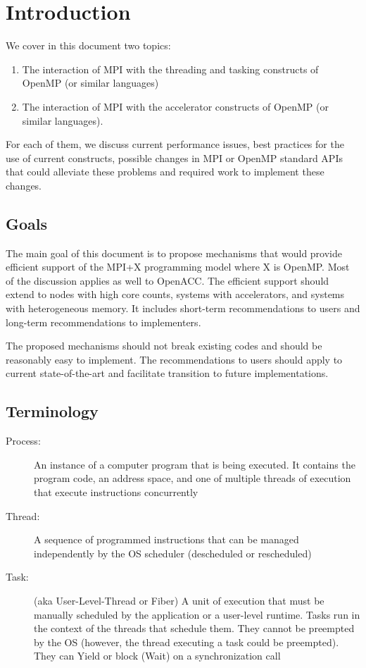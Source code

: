 \section{Introduction}
We cover in this document two topics:
\begin{enumerate}
	\item The interaction of MPI with the threading and tasking constructs of 
	OpenMP (or similar languages)
	\item The interaction of MPI with the accelerator constructs of OpenMP (or 
	similar languages).
\end{enumerate}

For each of them, we discuss current performance issues, best practices for the 
use of current constructs, possible changes in MPI or OpenMP standard APIs that 
could alleviate these problems and  required work to implement these changes.

\subsection{Goals}
The main goal of this document is to propose mechanisms that would provide 
efficient support of the MPI+X programming 
model where X is OpenMP. Most of the discussion applies as well to OpenACC. The 
efficient support should extend to nodes with high core counts, systems with 
accelerators, and systems with heterogeneous memory. It includes short-term 
recommendations to users and long-term recommendations to implementers.

The proposed mechanisms should not break existing codes and should be 
reasonably easy to implement. The recommendations to users should apply to 
current state-of-the-art and facilitate transition to future implementations.

\subsection{Terminology}
\begin{description}
\item[Process:]
An instance of a computer program that is being executed. It contains the 
program code, an address space,  and one of multiple threads of execution that 
execute 
instructions concurrently
\item[Thread:] A sequence of programmed instructions that can be managed 
independently by the OS scheduler (descheduled or rescheduled)
\item[Task:] (aka User-Level-Thread or Fiber) A  unit of execution that must be 
manually scheduled by the application or a user-level runtime. Tasks run in the 
context of the threads 
that schedule them. They cannot be preempted by the OS (however, the thread 
executing a task could be preempted). They can Yield or block (Wait) on a 
synchronization call
\end{description}


